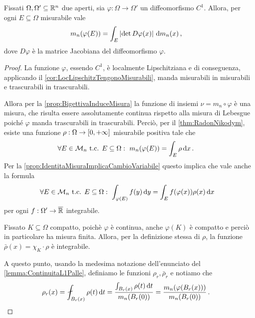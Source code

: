 \begin{lemma}\label{lemma:MisuraImmagine}
	Fissati $\Omega,\Omega'\subseteq\mathbb R^n$ due aperti, sia $\varphi:\Omega\to\Omega'$ un diffeomorfismo $C^1$.
	Allora, per ogni $E\subseteq \Omega$ misurabile vale
	\begin{equation*}
		m_n(\varphi(E))=\int_E\left\lvert \det D\varphi(x) \right\rvert \,\mathrm d m_n(x)\, \text{, }
	\end{equation*}
	dove $D\varphi$ è la matrice Jacobiana del diffeomorfismo $\varphi$.
\end{lemma}
\begin{proof}
	La funzione $\varphi$, essendo $C^1$, è localmente Lipschitziana e di conseguenza, applicando il \cref{cor:LocLipschitzTengonoMisurabili}, manda misurabili in misurabili e trascurabili in trascurabili.
	
	Allora per la \cref{prop:BigettivaInduceMisura} la funzione di insiemi $\nu=m_n\circ \varphi$ è una misura, che risulta essere assolutamente continua rispetto alla misura di Lebesgue poiché $\varphi$ manda trascurabili in trascurabili.
	Perciò, per il \cref{thm:RadonNikodym}, esiste una funzione $\rho:\Omega\to[0,+\infty]$ misurabile positiva tale che
	\begin{equation*}
		\forall E\in \mathcal M_n\text{ t.c. } E\subseteq \Omega:\ m_n(\varphi(E))=\int_E \rho \,\mathrm d x \, \text{. }
	\end{equation*}
	Per la \cref{prop:IdentitaMisuraImplicaCambioVariabile} questo implica che vale anche la formula
	\begin{equation}\label{eq:CambioRadonNikodym}
		\forall E\in \M_n\text{ t.c. } E\subseteq\Omega:\ \int_{\varphi(E)} f(y)\de y = \int_{E} f(\varphi(x))\rho(x) \de x
	\end{equation}
	per ogni $f:\Omega'\to\overline{\mathbb R}$ integrabile.
	
	Fissato $K\subseteq\Omega$ compatto, poichè $\varphi$ è continua, anche $\varphi(K)$ è compatto e perciò in particolare ha misura finita.
	Allora, per la definizione stessa di $\rho$, la funzione $\bar\rho(x)=\chi_K\cdot\rho$ è integrabile.
	
	A questo punto, usando la medesima notazione dell'enunciato del \cref{lemma:ContinuitaL1Palle}, definiamo le funzioni $\rho_r, \bar\rho_r$ e notiamo che
	\begin{equation*}
		\rho_r(x)=\aint_{B_r(x)}\rho(t)\de t=\frac{\int_{B_r(x)} \rho(t)\de t}{m_n(B_r(0))}=\frac{m_n(\varphi(B_r(x)))}{m_n(B_r(0))}\punto
	\end{equation*}
	

\end{proof}
